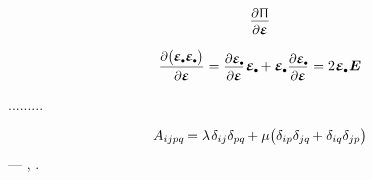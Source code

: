 \begin{equation*}
\scalebox{.92}{$
   \displaystyle
   \frac{ \raisemath{-0.133em}{ \partial \hspace{.1ex} \potentialenergydensity } }
   { \raisemath{-0.07em}{ \partial \infinitesimaldeformation } }
$}
\end{equation*}

\begin{gather*}
\scalebox{.92}{$
   \displaystyle
   \frac{\raisemath{-0.133em}{
      \partial \bigl( \infinitesimaldeformation\tracedot \hspace{.2ex} \infinitesimaldeformation\tracedot \hspace{.2ex} \bigr)
   }}{ \raisemath{-0.07em}{\partial \infinitesimaldeformation} }
$}
=
\scalebox{.92}{$
   \displaystyle
   \frac{\raisemath{-0.133em}{
      \partial \infinitesimaldeformation\tracedot
   }}{ \raisemath{-0.07em}{\partial \infinitesimaldeformation} }
$}
\hspace{.2ex} \infinitesimaldeformation\tracedot
+
\infinitesimaldeformation\tracedot \hspace{.2ex}
\scalebox{.92}{$
   \displaystyle
   \frac{ \raisemath{-0.133em}{
      \partial \infinitesimaldeformation\tracedot
   }}{ \raisemath{-0.07em}{\partial \infinitesimaldeformation} }
$}
\hspace{.1ex} =
2 \hspace{.1ex} \infinitesimaldeformation\tracedot \hspace{.3ex} \UnitDyad
\end{gather*}

.........


\begin{equation}\label{componentsofthestiffnesstensor.forisotropic}
A_{ijpq} \hspace{-0.2ex} =
\lambda \hspace{.2ex}
\delta_{ij}
\delta_{pq} \hspace{-0.2ex}
+
\mu
\bigl(
\delta_{ip}
\delta_{jq} \hspace{-0.2ex}
+
\delta_{iq}
\delta_{jp}
\bigr)
\end{equation}\:---
,
.

